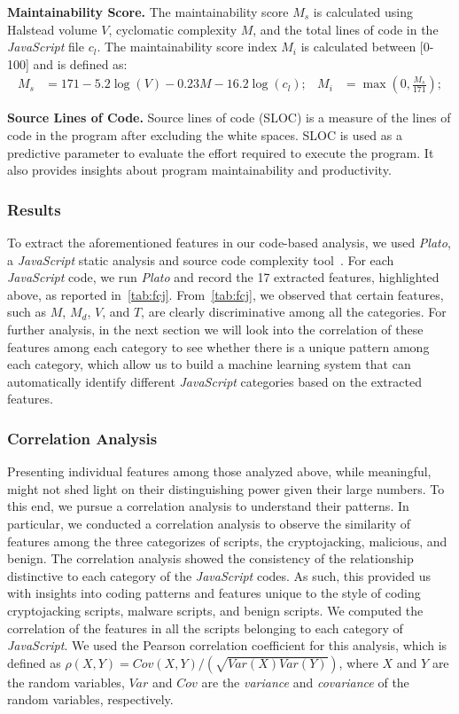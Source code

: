 \documentclass[acmlarge]{acmart}
\newcommand{\BfPara}[1]{{\noindent\bf#1.}\xspace\xspace}
\newcommand{\js}{{\em JavaScript}\xspace}
\newcommand{\pl}{{\em Plato}\xspace}
\newcommand{\cj}{cryptojacking\xspace}
\begin{document}
\BfPara{Maintainability Score} The maintainability score $M_s$ is calculated using Halstead volume $V$, cyclomatic complexity $M$, and the total lines of code in the \js file $c_l$. The maintainability score index $M_i$ is calculated between [0-100] and is defined as: 
\begin{align} 
\nonumber M_s & =  171 - 5.2 \log (V) - 0.23M  - 16.2 \log (c_l); & M_i &= \max(0, \frac{M_s}{171});
\end{align}


\BfPara{Source Lines of Code} Source lines of code (SLOC) is a measure of the lines of code in the program after excluding the white spaces. SLOC is used as a predictive parameter to evaluate the effort required to execute the program. It also provides insights about program maintainability and productivity. 



\subsubsection*{Results} To extract the aforementioned features in our code-based analysis, we used \pl, a \js static analysis and source code complexity tool~\cite{badge_2016}. For each \js code, we run \pl and record the 17 extracted features, highlighted above, as reported in~\autoref{tab:fcj}. From~\autoref{tab:fcj}, we observed that certain features, such as $M$, $M_d$, $V$, and $T$, are clearly discriminative among all the categories. For further analysis, in the next section we will look into the correlation of these features among each category to see whether there is a unique pattern among each category, which allow us to build a machine learning system that can automatically identify different \js categories based on the extracted features. 


\subsubsection{Correlation Analysis} \label{sec:correlation}
Presenting individual features among those analyzed above, while meaningful, might not shed light on their distinguishing power given their large numbers. To this end, we  pursue a correlation analysis to understand their patterns. In particular, we conducted a correlation analysis to observe the similarity of features among the three categorizes of scripts, the \cj, malicious, and benign. The correlation analysis showed the consistency of the relationship distinctive to each category of the \js codes. As such, this provided us with insights into coding patterns and features unique to the style of coding \cj scripts, malware scripts, and benign scripts. We computed the correlation of the features in all the scripts belonging to each category of \js. We used the Pearson correlation coefficient for this analysis, which is defined as $\rho(X,Y) = {{Cov}(X,Y)}/({\sqrt{{Var}(X){Var}(Y)}})$, where $X$ and $Y$ are the random variables, $Var$ and $Cov$ are the {\em variance} and {\em covariance} of the random variables, respectively. 
\end{document}
